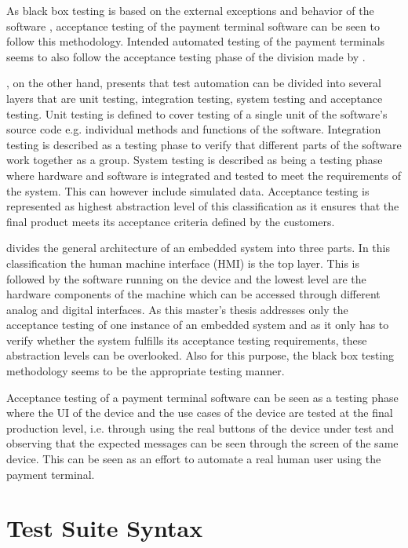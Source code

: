 As black box testing is based on the external exceptions and behavior of the software \citep{khan2012comparative}, acceptance testing of the payment terminal software can be seen to follow this methodology. Intended automated testing of the payment terminals seems to also follow the acceptance testing phase of the division made by \cite{khan2012comparative}.

\cite{huizinga2007automated}, on the other hand, presents that test automation can be divided into several layers that are unit testing, integration testing, system testing and acceptance testing. Unit testing is defined to cover testing of a single unit of the software's source code e.g. individual methods and functions of the software. Integration testing is described as a testing phase to verify that different parts of the software work together as a group. System testing is described as being a testing phase where hardware and software is integrated and tested to meet the requirements of the system. This can however include simulated data. Acceptance testing is represented as highest abstraction level of this classification as it ensures that the final product meets its acceptance criteria defined by the customers.

\cite{Ramler} divides the general architecture of an embedded system into three parts. In this classification the human machine interface (HMI) is the top layer. This is followed by the software running on the device and the lowest level are the hardware components of the machine which can be accessed through different analog and digital interfaces. As this master's thesis addresses only the acceptance testing of one instance of an embedded system and as it only has to verify whether the system fulfills its acceptance testing requirements, these abstraction levels can be overlooked. Also for this purpose, the black box testing methodology seems to be the appropriate testing manner.

Acceptance testing of a payment terminal software can be seen as a testing phase where the UI of the device and the use cases of the device are tested at the final production level, i.e. through using the real buttons of the device under test and observing that the expected messages can be seen through the screen of the same device. This can be seen as an effort to automate a real human user using the payment terminal.

\section{Test Suite Syntax}
\label{section:test suite syntax}

